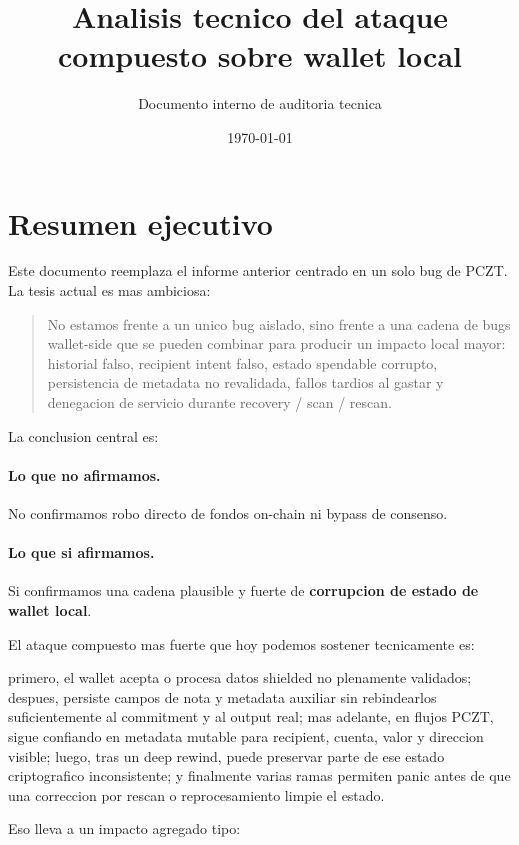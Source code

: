 \documentclass[11pt,a4paper]{article}
\title{Analisis tecnico del ataque compuesto sobre wallet local}
\author{Documento interno de auditoria tecnica}
\date{\today}
\begin{document}
\maketitle

\tableofcontents
\newpage

\section{Resumen ejecutivo}

Este documento reemplaza el informe anterior centrado en un solo bug de PCZT.
La tesis actual es mas ambiciosa:

\begin{quote}
No estamos frente a un unico bug aislado, sino frente a una cadena de bugs
wallet-side que se pueden combinar para producir un impacto local mayor:
historial falso, recipient intent falso, estado spendable corrupto,
persistencia de metadata no revalidada, fallos tardios al gastar y
denegacion de servicio durante recovery / scan / rescan.
\end{quote}

La conclusion central es:

\paragraph{Lo que no afirmamos.}
No confirmamos robo directo de fondos on-chain ni bypass de consenso.

\paragraph{Lo que si afirmamos.}
Si confirmamos una cadena plausible y fuerte de \textbf{corrupcion de estado
de wallet local}.

El ataque compuesto mas fuerte que hoy podemos sostener tecnicamente es:

primero, el wallet acepta o procesa datos shielded no plenamente validados;
despues, persiste campos de nota y metadata auxiliar sin rebindearlos
suficientemente al commitment y al output real; mas adelante, en flujos PCZT,
sigue confiando en metadata mutable para recipient, cuenta, valor y direccion
visible; luego, tras un deep rewind, puede preservar parte de ese estado
criptografico inconsistente; y finalmente varias ramas permiten panic antes de
que una correccion por rescan o reprocesamiento limpie el estado.

Eso lleva a un impacto agregado tipo:
\end{document}
